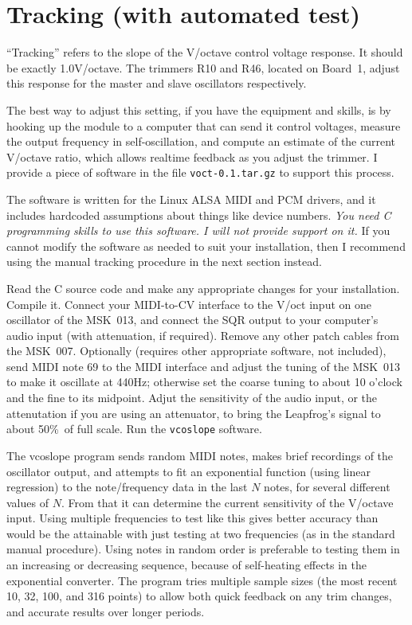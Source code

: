 \section{Tracking (with automated test)}

``Tracking'' refers to the slope of the V/octave control voltage response. 
It should be exactly 1.0V/octave.  The trimmers R10 and R46, located on
Board~1, adjust this response for the master and slave oscillators
respectively.

The best way to adjust this setting, if you have the equipment and
skills, is by hooking up the module to a computer that can send it control
voltages, measure the output frequency in self-oscillation, and compute an
estimate of the current V/octave ratio, which allows realtime feedback as
you adjust the trimmer.  I provide a piece of software in the file
\texttt{voct-0.1.tar.gz} to support this process.

The software is written for the Linux ALSA MIDI and PCM drivers, and it
includes hardcoded assumptions about things like device numbers.  \emph{You
need C programming skills to use this software.  I will not provide
support on it.}  If you cannot modify the software as needed to suit your
installation, then I recommend using the manual tracking procedure in the
next section instead.

Read the C source code and make any appropriate changes for your
installation.  Compile it.  Connect your MIDI-to-CV interface to the V/oct
input on one oscillator of the MSK~013, and connect the SQR output to your
computer's audio input (with attenuation, if required).  Remove any other
patch cables from the MSK~007.  Optionally (requires other appropriate
software, not included), send MIDI note 69 to the MIDI interface and adjust
the tuning of the MSK~013 to make it oscillate at 440Hz; otherwise set the
coarse tuning to about 10 o'clock and the fine to its midpoint.  Adjut the
sensitivity of the audio input, or the attenutation if you are using an
attenuator, to bring the Leapfrog's signal to about 50\%\ of full scale. 
Run the \texttt{vcoslope} software.

The vcoslope program sends random MIDI notes, makes brief recordings of the
oscillator output, and attempts to fit an exponential function (using linear
regression) to the note/frequency data in the last $N$ notes, for several
different values of $N$.  From that it can determine the current sensitivity
of the V/octave input.  Using multiple frequencies to test like this gives
better accuracy than would be the attainable with just testing at two
frequencies (as in the standard manual procedure).  Using notes in random
order is preferable to testing them in an increasing or decreasing sequence,
because of self-heating effects in the exponential converter.  The program
tries multiple sample sizes (the most recent 10, 32, 100, and 316 points)
to allow both quick feedback on any trim changes, and accurate results over
longer periods.

